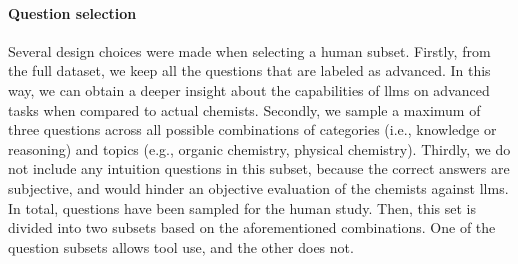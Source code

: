 \paragraph{Question selection}

Several design choices were made when selecting a human subset. Firstly, from the full dataset, we keep all the questions that are labeled as advanced. In this way, we can obtain a deeper insight about the capabilities of \glspl{llm} on advanced tasks
when compared to actual chemists. Secondly, we sample a maximum of three questions across all possible combinations of categories (i.e., knowledge or reasoning) and topics (e.g., organic chemistry, physical chemistry). Thirdly, we do not include any intuition questions
in this subset, because the correct answers are subjective, and would hinder an objective evaluation of the chemists against \glspl{llm}. In total,  questions have been sampled for the human study. Then, this set is divided into two subsets based on the aforementioned combinations. One of the question subsets allows tool use, and the other does not.
